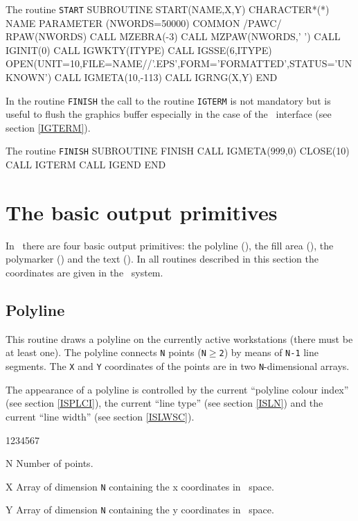 \begin{XMPt}{The routine {\tt START}}
      SUBROUTINE START(NAME,X,Y)
      CHARACTER*(*) NAME
      PARAMETER (NWORDS=50000)
      COMMON /PAWC/ RPAW(NWORDS)
      CALL MZEBRA(-3)
      CALL MZPAW(NWORDS,' ')
      CALL IGINIT(0)
      CALL IGWKTY(ITYPE)
      CALL IGSSE(6,ITYPE)
      OPEN(UNIT=10,FILE=NAME//'.EPS',FORM='FORMATTED',STATUS='UNKNOWN')
      CALL IGMETA(10,-113)
      CALL IGRNG(X,Y)
      END
\end{XMPt}
In the routine {\tt FINISH} the call to the routine {\tt IGTERM} is not
mandatory but is useful to flush the graphics buffer especially in the
case of the ~interface (see section \ref{IGTERM}).
\begin{XMPt}{The routine {\tt FINISH}}
      SUBROUTINE FINISH
      CALL IGMETA(999,0)
      CLOSE(10)
      CALL IGTERM
      CALL IGEND
      END
\end{XMPt}
\newpage
%
%

\section{The basic output primitives}
\par
In \HIGZ~there are four basic output primitives: the polyline (),
the fill area (), the polymarker () and the text
(). In all routines described in this section the coordinates
are given in the \WC~system.


\subsection{Polyline}
\Action
This routine draws a polyline on the currently active workstations (there must
be at least one). The polyline connects {\tt N} points ({\tt N$\geq$2}) by means
of {\tt N-1} line segments. The {\tt X} and {\tt Y} coordinates of the points
are in two {\tt N}-dimensional arrays.

The appearance of a polyline is controlled by the current ``polyline colour
index'' (see  section \ref{ISPLCI}), the current
``line type'' (see  section \ref{ISLN}) and the current
``line width'' (see  section \ref{ISLWSC}).
\Pdesc
\begin{DLtt}{1234567}
\item[N] Number of points.
\item[X] Array of dimension {\tt N} containing the x coordinates in \wc~space.
\item[Y] Array of dimension {\tt N} containing the y coordinates in \wc~space.
\end{DLtt}


